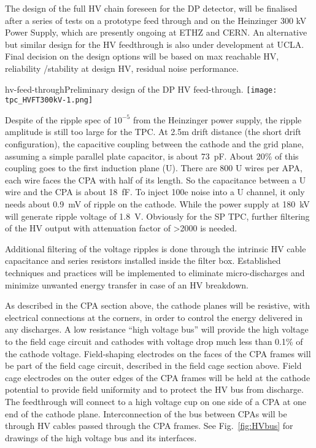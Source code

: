 The design of the full HV chain foreseen for the DP detector, will be finalised  after a series of tests on a prototype feed through and on the Heinzinger 300 kV Power Supply, which are presently ongoing at ETHZ and CERN. An alternative but similar design for the HV feedthrough is also under development at UCLA. Final decision on the design options will be based on max reachable HV, reliability /stability at design HV, residual noise performance.


\begin{cdrfigure}{hv-feed-through}{Preliminary design of the DP HV feed-through.}
\texttt{[image: tpc\_HVFT300kV-1.png]}
\end{cdrfigure}



Despite of the ripple spec of $10^{-5}$ from the Heinzinger power supply, the ripple amplitude is still too large for the TPC.  At 2.5m drift distance (the short drift configuration), the capacitive coupling between the cathode and the grid plane, assuming a simple parallel plate capacitor, is about 73~pF.  About 20\% of this coupling goes to the first induction plane (U).  There are 800 U wires per APA, each wire faces the CPA with half of its length. So the capacitance between a U wire and the CPA is about 18~fF.  To inject 100e noise into a U channel, it only needs about 0.9~mV of ripple on the cathode.  While the power supply at 180~kV will generate ripple voltage of 1.8~V.  Obviously for the SP TPC, further filtering of the HV output with attenuation factor of >2000 is needed. 

Additional filtering of the voltage ripples is done
through the intrinsic HV cable capacitance and series resistors
installed inside the filter box. Established techniques and practices
will be implemented to eliminate micro-discharges and minimize
unwanted energy transfer in case of an HV breakdown.


As described in the CPA section above, the cathode planes will be
resistive, with electrical connections at the corners, in order to
control the energy delivered in any discharges.  A low resistance
``high voltage bus'' will provide the high voltage to the field cage
circuit and cathodes with voltage drop much less than 0.1\% of the
cathode voltage.  Field-shaping electrodes on the faces of the CPA
frames will be part of the field cage circuit, described in the field
cage section above. Field cage electrodes on the outer edges of the
CPA frames will be held at the cathode potential to provide field
uniformity and to protect the HV bus from discharge.  The feedthrough
will connect to a high voltage cup on one side of a CPA at one end of
the cathode plane.  Interconnection of the bus between CPAs will be
through HV cables passed through the CPA frames.  See
Fig.~\ref{fig:HVbus} for drawings of the high voltage bus and its
interfaces.

